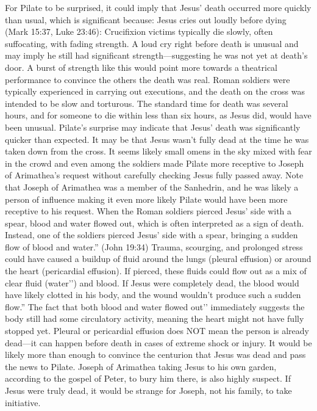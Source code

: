For Pilate to be surprised, it could imply that Jesus’ death occurred more quickly than usual, which is significant because:
Jesus cries out loudly before dying (Mark 15:37, Luke 23:46): Crucifixion victims typically die slowly, often suffocating, with fading strength.
A loud cry right before death is unusual and may imply he still had significant strength—suggesting he was not yet at death’s door.
A burst of strength like this would point more towards a theatrical performance to convince the others the death was real.
Roman soldiers were typically experienced in carrying out executions, and the death on the cross was intended to be slow and torturous.
The standard time for death was several hours, and for someone to die within less than six hours, as Jesus did, would have been unusual.
Pilate’s surprise may indicate that Jesus’ death was significantly quicker than expected.
It may be that Jesus wasn’t fully dead at the time he was taken down from the cross.
It seems likely small omens in the sky mixed with fear in the crowd and even among the soldiers made Pilate more receptive to Joseph of Arimathea’s request without carefully checking Jesus fully passed away.
Note that Joseph of Arimathea was a member of the Sanhedrin, and he was likely a person of influence making it even more likely Pilate would have been more receptive to his request.
When the Roman soldiers pierced Jesus’ side with a spear, blood and water flowed out, which is often interpreted as a sign of death.
Instead, one of the soldiers pierced Jesus' side with a spear, bringing a sudden flow of blood and water.'' (John 19:34) Trauma, scourging, and prolonged stress could have caused a buildup of fluid around the lungs (pleural effusion) or around the heart (pericardial effusion). If pierced, these fluids could flow out as a mix of clear fluid (water’’) and blood.
If Jesus were completely dead, the blood would have likely clotted in his body, and the wound wouldn’t produce such a sudden flow.'' The fact that both blood and water flowed out’’ immediately suggests the body still had some circulatory activity, meaning the heart might not have fully stopped yet.
Pleural or pericardial effusion does NOT mean the person is already dead—it can happen before death in cases of extreme shock or injury.
It would be likely more than enough to convince the centurion that Jesus was dead and pass the news to Pilate.
Joseph of Arimathea taking Jesus to his own garden, according to the gospel of Peter, to bury him there, is also highly suspect.
If Jesus were truly dead, it would be strange for Joseph, not his family, to take initiative.
